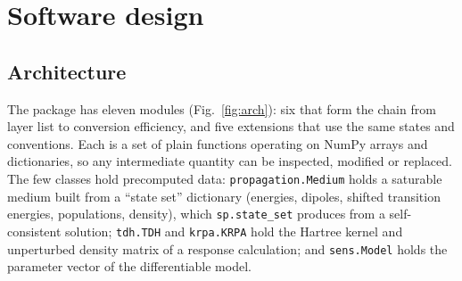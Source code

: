 \documentclass[11pt]{article}
\newcommand{\code}[1]{\texttt{#1}}
\begin{document}
\section{Software design}
\subsection{Architecture}
The package has eleven modules (Fig.~\ref{fig:arch}): six that form the chain from layer list to conversion efficiency, and five extensions that use the same states and conventions. Each is a set of plain functions operating on NumPy arrays and dictionaries, so any intermediate quantity can be inspected, modified or replaced. The few classes hold precomputed data: \code{propagation.Medium} holds a saturable medium built from a ``state set'' dictionary (energies, dipoles, shifted transition energies, populations, density), which \code{sp.state\_set} produces from a self-consistent solution; \code{tdh.TDH} and \code{krpa.KRPA} hold the Hartree kernel and unperturbed density matrix of a response calculation; and \code{sens.Model} holds the parameter vector of the differentiable model.
\end{document}
